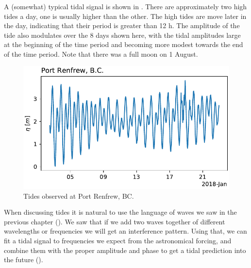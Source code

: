 A (somewhat) typical tidal signal is shown in .  There are approximately two high tides a day, one is usually higher than the other.  The high tides are move later in the day, indicating that their period is greater than 12 h.  The amplitude of the tide also modulates over the 8 days shown here, with the tidal amplitudes large at the beginning of the time period and becoming more modest towards the end of the time period.  Note that there was a full moon on 1 August.  

\begin{figure}[hbt]
  \begin{center}
    \includegraphics{figs/Waves/TidesRenfrew}
    \caption{Tides observed at Port Renfrew, BC.  }
    \label{fig:TideRenfrew}  
  \end{center}
\end{figure}

When discussing tides it is natural to use the language of waves we saw in the previous chapter ().  We saw that if we add two waves together of different wavelengths or frequencies we will get an interference pattern.  Using that, we can fit a tidal signal to frequencies we expect from the astronomical forcing, and combine them with the proper amplitude and phase to get a tidal prediction into the future ().

